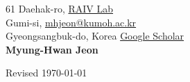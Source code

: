 \documentclass{cv} %
\begin{document}
61 Daehak-ro, \hfill \href{https://raivlab.github.io}{RAIV Lab}\\
Gumi-si, \hfill \href{mailto:mhjeon@kumoh.ac.kr}{mhjeon@kumoh.ac.kr}\\
Gyeongsangbuk-do, Korea \hfill \href{https://scholar.google.com/citations?user=ivOqySYAAAAJ}{Google Scholar}\\

\hfil{\namesize\bf Myung-Hwan Jeon}\hfil

\vspace{-3mm}



\clearpage
% 

\clearpage



% 




\vspace{0.5in}
\hfill Revised \today
\end{document}
